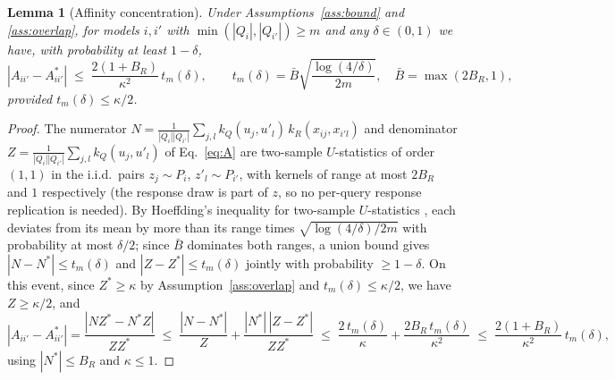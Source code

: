 \documentclass{article}
\newtheorem{lemma}{Lemma}
\theoremstyle{definition}
\theoremstyle{plain}
\begin{document}
\begin{lemma}[Affinity concentration]
\label{lem:conc}
Under Assumptions~\ref{ass:bound} and \ref{ass:overlap}, for models $i,i'$ with
$\min(|Q_i|,|Q_{i'}|)\ge m$ and any $\delta\in(0,1)$ we have, with probability at
least $1-\delta$,
\[
|A_{ii'}-A^*_{ii'}|\;\le\;\frac{2(1+B_R)}{\kappa^2}\,t_m(\delta),
\qquad t_m(\delta)=\bar B\sqrt{\frac{\log(4/\delta)}{2m}},\quad \bar B=\max(2B_R,1),
\]
provided $t_m(\delta)\le\kappa/2$.
\end{lemma}
\begin{proof}
\begin{sloppypar}
The numerator $N=\frac{1}{|Q_i||Q_{i'}|}\sum_{j,l}k_Q(u_j,u'_l)\,k_R(x_{ij},x_{i'l})$ and
denominator $Z=\frac{1}{|Q_i||Q_{i'}|}\sum_{j,l}k_Q(u_j,u'_l)$ of Eq.~\eqref{eq:A} are
two-sample $U$-statistics of order $(1,1)$ in the i.i.d.\ pairs $z_j\sim P_i$,
$z'_l\sim P_{i'}$, with kernels of range at most $2B_R$ and $1$ respectively (the
response draw is part of $z$, so no per-query response replication is needed). By
Hoeffding's inequality for two-sample $U$-statistics
, each deviates from its mean by more than its range times
$\sqrt{\log(4/\delta)/2m}$ with probability at most $\delta/2$; since $\bar B$ dominates
both ranges, a union bound gives $|N-N^*|\le t_m(\delta)$ and $|Z-Z^*|\le t_m(\delta)$
jointly with probability $\ge1-\delta$. On this event, since $Z^*\ge\kappa$ by Assumption~\ref{ass:overlap} and $t_m(\delta)\le\kappa/2$,
we have $Z\ge\kappa/2$, and
\[
|A_{ii'}-A^*_{ii'}|=\frac{|NZ^*-N^*Z|}{ZZ^*}
\;\le\;\frac{|N-N^*|}{Z}+\frac{|N^*|\,|Z-Z^*|}{ZZ^*}
\;\le\;\frac{2\,t_m(\delta)}{\kappa}+\frac{2B_R\,t_m(\delta)}{\kappa^2}
\;\le\;\frac{2(1+B_R)}{\kappa^2}\,t_m(\delta),
\]
using $|N^*|\le B_R$ and $\kappa\le1$.
\end{sloppypar}
\end{proof}
\end{document}
